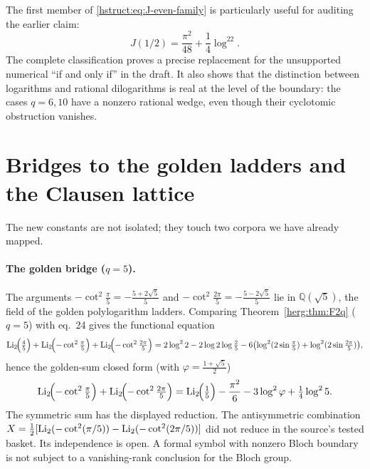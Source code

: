 The first member of \eqref{hstruct:eq:J-even-family} is particularly useful
for auditing the earlier claim:
\begin{equation}\label{hstruct:eq:Jhalf}
 J(1/2)=\frac{\pi^2}{48}+\frac14\log^22.
\end{equation}
The complete classification proves a precise replacement for the
unsupported numerical ``if and only if'' in the draft. It also shows
that the distinction between logarithms and rational dilogarithms is
real at the level of the boundary: the cases $q=6,10$ have a nonzero
rational wedge, even though their cyclotomic obstruction vanishes.

\section{Bridges to the golden ladders and the Clausen lattice}\label{herg:sec:bridges}
The new constants are not isolated; they touch two corpora we have already mapped.

\paragraph{The golden bridge ($q=5$).} The arguments $-\cot^2\tfrac\pi5=-\tfrac{5+2\sqrt5}5$ and
$-\cot^2\tfrac{2\pi}5=-\tfrac{5-2\sqrt5}5$ lie in $\mathbb Q(\sqrt5)$, the field of the golden polylogarithm
ladders. Comparing Theorem~\ref{herg:thm:F2q} ($q=5$) with eq.~24 gives the functional equation
\[
  \operatorname{Li}_2\!\Bigl(\tfrac45\Bigr)+\operatorname{Li}_2\!\Bigl(-\cot^2\tfrac{\pi}{5}\Bigr)+\operatorname{Li}_2\!\Bigl(-\cot^2\tfrac{2\pi}{5}\Bigr)
  =2\log^2 2-2\log2\log\tfrac25-6\bigl(\log^2(2\sin\tfrac\pi5)+\log^2(2\sin\tfrac{2\pi}5)\bigr),
\]
hence the golden-sum closed form (with $\varphi=\tfrac{1+\sqrt5}2$)
\[
  \operatorname{Li}_2\!\Bigl(-\cot^2\tfrac{\pi}{5}\Bigr)+\operatorname{Li}_2\!\Bigl(-\cot^2\tfrac{2\pi}{5}\Bigr)
  =\operatorname{Li}_2\!\Bigl(\tfrac15\Bigr)-\frac{\pi^2}{6}-3\log^2\varphi+\tfrac14\log^2 5 .
\]
The symmetric sum has the displayed reduction. The antisymmetric
combination $X=\frac12[\operatorname{Li}_2(-\cot^2(\pi/5))-
\operatorname{Li}_2(-\cot^2(2\pi/5))]$ did not reduce in the source's tested basket.
Its independence is open. A formal symbol with nonzero Bloch boundary
is not subject to a vanishing-rank conclusion for the Bloch group.


